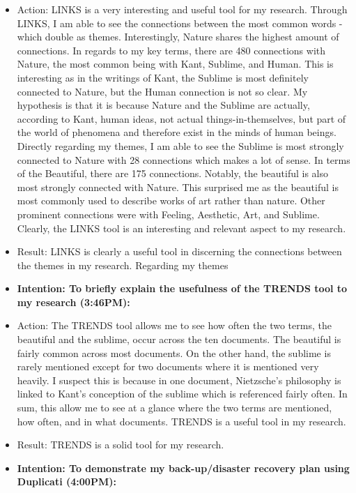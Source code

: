 \documentclass[a4paper,12pt]{article}
\begin{document}
\begin{itemize}
\item Action: LINKS is a very interesting and useful tool for my research. Through LINKS, I am able to see the connections between the most common words - which double as themes. Interestingly, Nature shares the highest amount of connections. In regards to my key terms, there are 480 connections with Nature, the most common being with Kant, Sublime, and Human. This is interesting as in the writings of Kant, the Sublime is most definitely connected to Nature, but the Human connection is not so clear. My hypothesis is that it is because Nature and the Sublime are actually, according to Kant, human ideas, not actual things-in-themselves, but part of the world of phenomena and therefore exist in the minds of human beings. Directly regarding my themes, I am able to see the Sublime is most strongly connected to Nature with 28 connections which makes a lot of sense. In terms of the Beautiful, there are 175 connections. Notably, the beautiful is also most strongly connected with Nature. This surprised me as the beautiful is most commonly used to describe works of art rather than nature. Other prominent connections were with Feeling, Aesthetic, Art, and Sublime. Clearly, the LINKS tool is an interesting and relevant aspect to my research. 


\item Result: LINKS is clearly a useful tool in discerning the connections between the themes in my research. Regarding my themes


\item \textbf{Intention: To briefly explain the usefulness of the TRENDS tool to my research (3:46PM):}


\item Action: The TRENDS tool allows me to see how often the two terms, the beautiful and the sublime, occur across the ten documents. The beautiful is fairly common across most documents. On the other hand, the sublime is rarely mentioned except for two documents where it is mentioned very heavily. I suspect this is because in one document, Nietzsche's philosophy is linked to Kant's conception of the sublime which is referenced fairly often. In sum, this allow me to see at a glance where the two terms are mentioned, how often, and in what documents. TRENDS is a useful tool in my research. 


\item Result: TRENDS is a solid tool for my research. 


\item \textbf{Intention: To demonstrate my back-up/disaster recovery plan using Duplicati (4:00PM):}



\end{itemize}
\end{document}
